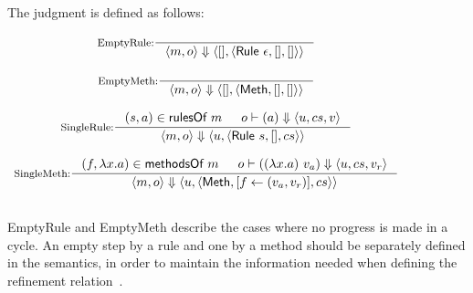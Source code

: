 \begin{definition}
  \label{def-semsstep}
  The judgment  is defined as follows:
  \begin{center}
    \begin{math}
      \begin{array}{c}
        \inference[EmptyRule:]{}
                  {\semsstep{m}{o}{\emptymap}
                    {\alpharule{\epsilon}}{\emptymap}{\emptymap}} \\
        \mbox{} \\
        \inference[EmptyMeth:]{}
                  {\semsstep{m}{o}{\emptymap}
                    {\alphameth}{\emptymap}{\emptymap}} \\
        \mbox{} \\
        \inference[SingleRule:]{\rulepair{s}{a} \in \rulesofm{m} & \semact{o}{a}{u}{cs}{v}}
                  {\semsstep{m}{o}{u}{\alpharule{s}}{\emptymap}{cs}} \\
        \mbox{} \\
        \inference[SingleMeth:]{\methodpair{f}{\lambda x.a} \in \methsofm{m} &
          \semact{o}{(\lambda x.a)\ v_a}{u}{cs}{v_r}}
                  {\semsstep{m}{o}{u}{\alphameth{}}{\lblupd{}{f}{(v_a, v_r)}}{cs}} \\
        \mbox{} \\
      \end{array}
    \end{math}
  \end{center}
\end{definition}

EmptyRule and EmptyMeth describe the cases where no progress is made
in a cycle. An empty step by a rule and one by a method should be
separately defined in the \Substep{} semantics, in order to maintain
the information needed when defining the refinement
relation~\cite{murali-thesis}.

